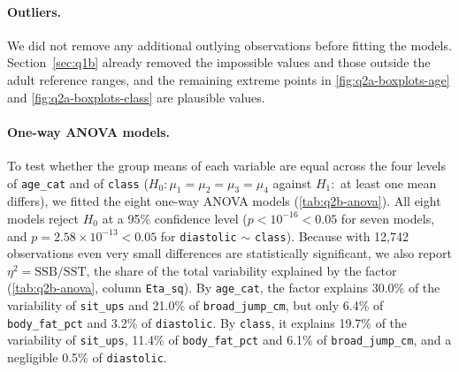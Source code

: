 \paragraph{Outliers.}
We did not remove any additional outlying observations before fitting the models.
Section~\ref{sec:q1b} already removed the impossible values and those outside the adult reference ranges, and the remaining extreme points in \autoref{fig:q2a-boxplots-age} and \autoref{fig:q2a-boxplots-class} are plausible values.

\paragraph{One-way ANOVA models.}
To test whether the group means of each variable are equal across the four levels of \texttt{age\_cat} and of \texttt{class} ($H_0\colon \mu_1 = \mu_2 = \mu_3 = \mu_4$ against $H_1\colon$ at least one mean differs), we fitted the eight one-way ANOVA models (\autoref{tab:q2b-anova}).
All eight models reject $H_0$ at a 95\% confidence level ($p < 10^{-16} < 0.05$ for seven models, and $p = 2.58 \times 10^{-13} < 0.05$ for \texttt{diastolic} $\sim$ \texttt{class}).
Because with 12,742 observations even very small differences are statistically significant, we also report $\eta^2 = \mathrm{SSB}/\mathrm{SST}$, the share of the total variability explained by the factor (\autoref{tab:q2b-anova}, column \texttt{Eta\_sq}).
By \texttt{age\_cat}, the factor explains 30.0\% of the variability of \texttt{sit\_ups} and 21.0\% of \texttt{broad\_jump\_cm}, but only 6.4\% of \texttt{body\_fat\_pct} and 3.2\% of \texttt{diastolic}.
By \texttt{class}, it explains 19.7\% of the variability of \texttt{sit\_ups}, 11.4\% of \texttt{body\_fat\_pct} and 6.1\% of \texttt{broad\_jump\_cm}, and a negligible 0.5\% of \texttt{diastolic}.

